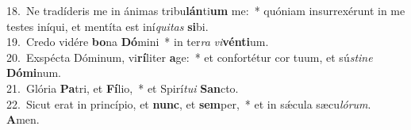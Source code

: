{18.~}Ne tradíderis me in ánimas tribu\textbf{lán}ti\textbf{um} me:~* quóniam insurrexérunt in me testes iníqui, et mentíta est iní\textit{qui}\textit{tas} \textbf{si}bi.\\
{19.~}Credo vidére \textbf{bo}na \textbf{Dó}mini~* in ter\textit{ra} \textit{vi}\textbf{vén}\textbf{ti}um.\\
{20.~}Exspécta Dóminum, vi\textbf{rí}liter \textbf{a}ge:~* et confortétur cor tuum, et sú\textit{sti}\textit{ne} \textbf{Dó}\textbf{mi}num.\\
{21.~}Glória \textbf{Pa}tri, et \textbf{Fí}lio,~* et Spirí\textit{tu}\textit{i} \textbf{San}cto.\\
{22.~}Sicut erat in princípio, et \textbf{nunc}, et \textbf{sem}per,~* et in sǽcula sæcu\textit{ló}\textit{rum}. \textbf{A}men.\\
